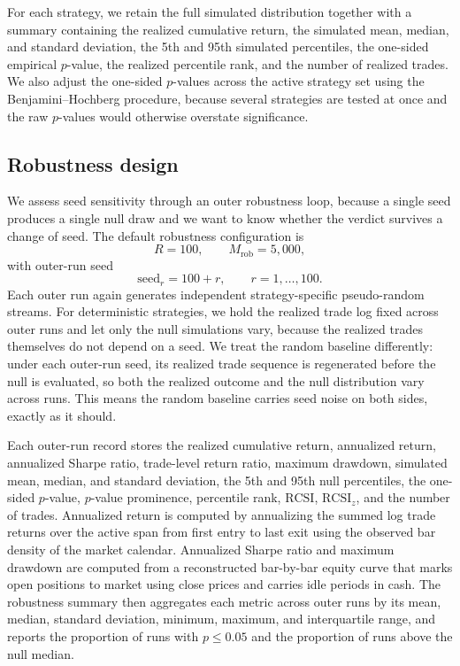 \documentclass[preprint,12pt]{elsarticle}
\theoremstyle{definition}
\begin{document}
For each strategy, we retain the full simulated distribution together with a summary containing the realized cumulative return, the simulated mean, median, and standard deviation, the 5th and 95th simulated percentiles, the one-sided empirical \(p\)-value, the realized percentile rank, and the number of realized trades. We also adjust the one-sided \(p\)-values across the active strategy set using the Benjamini--Hochberg procedure, because several strategies are tested at once and the raw \(p\)-values would otherwise overstate significance.

\subsection{Robustness design}

We assess seed sensitivity through an outer robustness loop, because a single seed produces a single null draw and we want to know whether the verdict survives a change of seed. The default robustness configuration is
\begin{equation}
R=100, \qquad M_{\mathrm{rob}}=5{,}000,
\end{equation}
with outer-run seed
\begin{equation}
\text{seed}_r = 100 + r, \qquad r=1,\ldots,100.
\end{equation}
Each outer run again generates independent strategy-specific pseudo-random streams. For deterministic strategies, we hold the realized trade log fixed across outer runs and let only the null simulations vary, because the realized trades themselves do not depend on a seed. We treat the random baseline differently: under each outer-run seed, its realized trade sequence is regenerated before the null is evaluated, so both the realized outcome and the null distribution vary across runs. This means the random baseline carries seed noise on both sides, exactly as it should.

Each outer-run record stores the realized cumulative return, annualized return, annualized Sharpe ratio, trade-level return ratio, maximum drawdown, simulated mean, median, and standard deviation, the 5th and 95th null percentiles, the one-sided \(p\)-value, \(p\)-value prominence, percentile rank, \(\mathrm{RCSI}\), \(\mathrm{RCSI}_z\), and the number of trades. Annualized return is computed by annualizing the summed log trade returns over the active span from first entry to last exit using the observed bar density of the market calendar. Annualized Sharpe ratio and maximum drawdown are computed from a reconstructed bar-by-bar equity curve that marks open positions to market using close prices and carries idle periods in cash. The robustness summary then aggregates each metric across outer runs by its mean, median, standard deviation, minimum, maximum, and interquartile range, and reports the proportion of runs with \(p\le 0.05\) and the proportion of runs above the null median.
\end{document}
